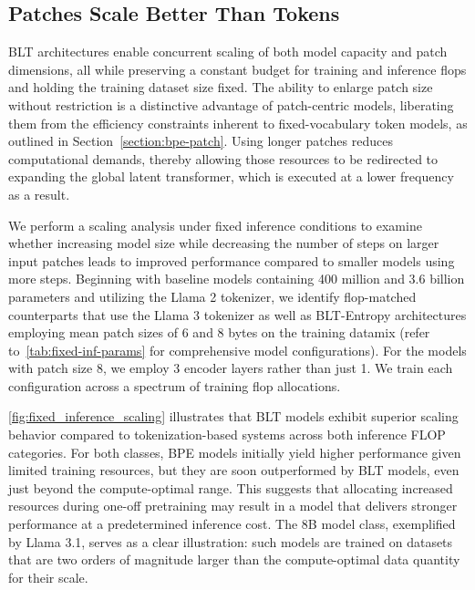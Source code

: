 \subsection{Patches Scale Better Than Tokens} {\textsc BLT} architectures enable concurrent scaling of both model capacity and patch dimensions, all while preserving a constant budget for training and inference flops and holding the training dataset size fixed. The ability to enlarge patch size without restriction is a distinctive advantage of patch-centric models, liberating them from the efficiency constraints inherent to fixed-vocabulary token models, as outlined in Section~\ref{section:bpe-patch}. Using longer patches reduces computational demands, thereby allowing those resources to be redirected to expanding the global latent transformer, which is executed at a lower frequency as a result.

We perform a scaling analysis under fixed inference conditions to examine whether increasing model size while decreasing the number of steps on larger input patches leads to improved performance compared to smaller models using more steps. Beginning with baseline models containing 400 million and 3.6 billion parameters and utilizing the Llama 2 tokenizer, we identify flop-matched counterparts that use the Llama 3 tokenizer as well as {\textsc BLT}-Entropy architectures employing mean patch sizes of 6 and 8 bytes on the training datamix (refer to~\autoref{tab:fixed-inf-params} for comprehensive model configurations). For the models with patch size 8, we employ 3 encoder layers rather than just 1. We train each configuration across a spectrum of training flop allocations.

\autoref{fig:fixed_inference_scaling} illustrates that {\textsc BLT} models exhibit superior scaling behavior compared to tokenization-based systems across both inference FLOP categories. For both classes, BPE models initially yield higher performance given limited training resources, but they are soon outperformed by {\textsc BLT} models, even just beyond the compute-optimal range. This suggests that allocating increased resources during one-off pretraining may result in a model that delivers stronger performance at a predetermined inference cost. The 8B model class, exemplified by Llama 3.1, serves as a clear illustration: such models are trained on datasets that are two orders of magnitude larger than the compute-optimal data quantity for their scale.

